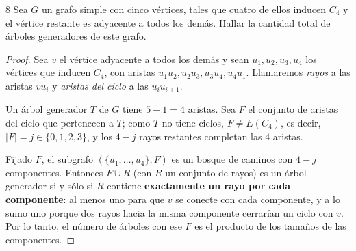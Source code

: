 \begin{ejercicioEntregar}{8}
    Sea \( G \) un grafo simple con cinco vértices, tales que cuatro de ellos inducen \( C_4 \) y el vértice restante es adyacente a todos los demás. Hallar la cantidad total de árboles generadores de este grafo.
\end{ejercicioEntregar}
\begin{proof}
    Sea \( v \) el vértice adyacente a todos los demás y sean \( u_1, u_2, u_3, u_4 \) los vértices que inducen \( C_4 \), con aristas \( u_1u_2, u_2u_3, u_3u_4, u_4u_1 \). Llamaremos \emph{rayos} a las aristas \( vu_i \) y \emph{aristas del ciclo} a las \( u_i u_{i+1} \).
    \begin{center}
    \end{center}
    Un árbol generador \( T \) de \( G \) tiene \( 5 - 1 = 4 \) aristas. Sea \( F \) el conjunto de aristas del ciclo que pertenecen a \( T \); como \( T \) no tiene ciclos, \( F \neq E(C_4) \), es decir, \( |F| = j \in \{0,1,2,3\} \), y los \( 4 - j \) rayos restantes completan las \( 4 \) aristas.

    Fijado \( F \), el subgrafo \( (\{u_1,\ldots,u_4\}, F) \) es un bosque de caminos con \( 4 - j \) componentes. Entonces \( F \cup R \) (con \( R \) un conjunto de rayos) es un árbol generador si y sólo si \( R \) contiene \textbf{exactamente un rayo por cada componente}: al menos uno para que \( v \) se conecte con cada componente, y a lo sumo uno porque dos rayos hacia la misma componente cerrarían un ciclo con \( v \). Por lo tanto, el número de árboles con ese \( F \) es el producto de los tamaños de las componentes.


\end{proof}
